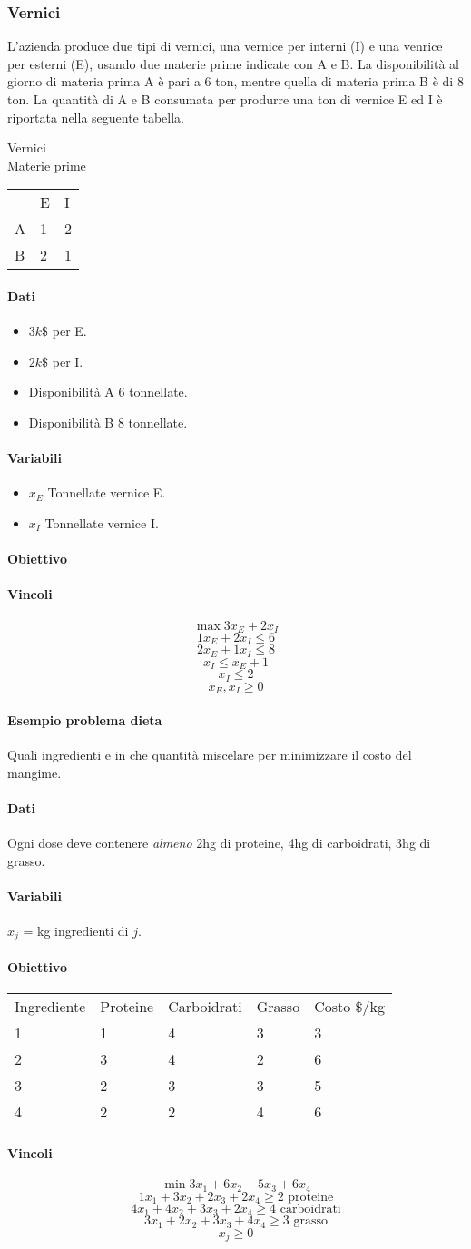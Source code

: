 \documentclass[12pt, twoside, letterpaper]{article}
\newcommand{\problema}[5]{
	#1
	\begin{dati}
		\paragraph{Dati} #2
	\end{dati}
	\begin{variabili}
		\paragraph{Variabili} #3
	\end{variabili}
	\begin{obiettivo}
		\paragraph{Obiettivo} #4
	\end{obiettivo}
	\begin{vincoli}
		\paragraph{Vincoli} #5
	\end{vincoli}
}
\begin{document}
			\subsubsection{Vernici}
				\problema
					{L'azienda produce due tipi di vernici, una vernice per interni (I) e una venrice per esterni (E), usando due materie prime indicate con A e B. La disponibilità al giorno di materia prima A è pari a 6 ton, mentre quella di materia prima B è di 8 ton. La quantità di A e B consumata per produrre una ton di vernice E ed I è riportata nella seguente tabella.
											
											\quad\qquad\qquad\qquad Vernici\\
						Materie prime
						\begin{tabular}{lll}
								& E & I \\
							A 	& 1	& 2 \\
							B	& 2	& 1
						\end{tabular}

					}
					{\begin{itemize}
						\item $3k\$$ per E.
						\item $2k\$$ per I.
						\item Disponibilità A 6 tonnellate.
						\item Disponibilità B 8 tonnellate.
					\end{itemize}}
					{\begin{itemize}
						\item $x_E$ Tonnellate vernice E.
						\item $x_I$ Tonnellate vernice I.
					\end{itemize}}
					{\begin{center}
					\end{center}}
					{$$\max 3x_E + 2x_I$$
					$$1x_E + 2x_I \leq 6$$
					$$2x_E + 1x_I \leq 8$$
					$$x_I \leq x_E + 1$$
					$$x_I \leq 2$$
					$$x_E, x_I \geq 0 $$
					}
			\paragraph{Esempio problema dieta}
				\problema{Quali ingredienti e in che quantità miscelare per minimizzare il costo del mangime.}
					{Ogni dose deve contenere \textit{almeno} 2hg di proteine, 4hg di carboidrati, 3hg di grasso.}
					{$x_j$ = kg ingredienti di $j$.}
					{\begin{tabular}{lllll}
						
						Ingrediente & Proteine & Carboidrati & Grasso & Costo $\$$/kg\\
						1 & 1 & 4 & 3 & 3\\
						2 & 3 & 4 & 2 & 6\\
						3 & 2 & 3 & 3 & 5\\
						4 & 2 & 2 & 4 & 6\\
					\end{tabular}}
					{$$\min 3x_1 + 6x_2 + 5x_3 + 6x_4$$
					$$1x_1 + 3x_2 + 2x_3 + 2x_4 \geq 2 \text{ proteine}$$
					$$4x_1 + 4x_2 + 3x_3 + 2x_4 \geq 4 \text{ carboidrati}$$
					$$3x_1 + 2x_2 + 3x_3 + 4x_4 \geq 3 \text{ grasso}$$
					$$x_j \geq 0$$
					}
						
\end{document}
